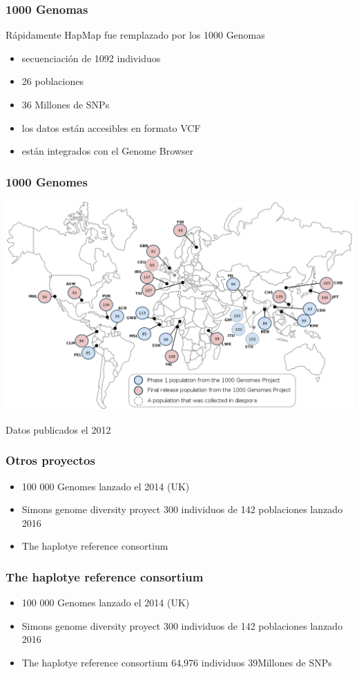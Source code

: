 \documentclass{beamer}\usepackage[]{graphicx}\usepackage[]{color}
\begin{document}
\begin{frame}[fragile]
\frametitle{1000 Genomas}

R\'apidamente HapMap fue remplazado por los 1000 Genomas
\begin{itemize}
\item     secuenciaci\'on de 1092 individuos
\item     26 poblaciones 
\item     36 Millones de SNPs 
\item     los datos est\'an accesibles en formato VCF 
\item     est\'an integrados con el Genome Browser 
\end{itemize}

\end{frame}


\begin{frame}[fragile]
\frametitle{1000 Genomes}

\begin{center}
\includegraphics[width=0.5\linewidth]{1000_Genomes.png}
\end{center}
Datos publicados el 2012
\end{frame}

\begin{frame}[fragile]
\frametitle{Otros proyectos}

\begin{itemize}
\item     100 000 Genomes lanzado el 2014 (UK)
\item     Simons genome diversity proyect 300 individuos de 142 poblaciones lanzado 2016
\item     The haplotye reference consortium 
\end{itemize}

\end{frame}

\begin{frame}[fragile]
\frametitle{The haplotye reference consortium}

\begin{itemize}
\item     100 000 Genomes lanzado el 2014 (UK)
\item     Simons genome diversity proyect 300 individuos de 142 poblaciones lanzado 2016
\item     The haplotye reference consortium  64,976 individuos 39Millones de SNPs
\end{itemize}

\end{frame}
\end{document}
